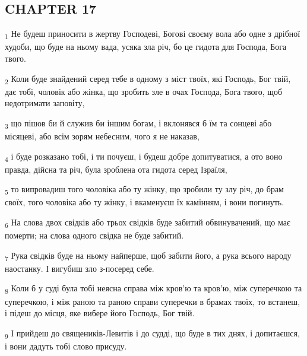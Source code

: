 \subsection{CHAPTER 17}
\begin{tcolorbox}
\textsubscript{1} Не будеш приносити в жертву Господеві, Богові своєму вола або одне з дрібної худоби, що буде на ньому вада, усяка зла річ, бо це гидота для Господа, Бога твого.
\end{tcolorbox}
\begin{tcolorbox}
\textsubscript{2} Коли буде знайдений серед тебе в одному з міст твоїх, які Господь, Бог твій, дає тобі, чоловік або жінка, що зробить зле в очах Господа, Бога твого, щоб недотримати заповіту,
\end{tcolorbox}
\begin{tcolorbox}
\textsubscript{3} що пішов би й служив би іншим богам, і вклонявся б їм та сонцеві або місяцеві, або всім зорям небесним, чого я не наказав,
\end{tcolorbox}
\begin{tcolorbox}
\textsubscript{4} і буде розказано тобі, і ти почуєш, і будеш добре допитуватися, а ото воно правда, дійсна та річ, була зроблена ота гидота серед Ізраїля,
\end{tcolorbox}
\begin{tcolorbox}
\textsubscript{5} то випровадиш того чоловіка або ту жінку, що зробили ту злу річ, до брам своїх, того чоловіка або ту жінку, і вкаменуєш їх камінням, і вони погинуть.
\end{tcolorbox}
\begin{tcolorbox}
\textsubscript{6} На слова двох свідків або трьох свідків буде забитий обвинувачений, що має померти; на слова одного свідка не буде забитий.
\end{tcolorbox}
\begin{tcolorbox}
\textsubscript{7} Рука свідків буде на ньому найперше, щоб забити його, а рука всього народу наостанку. І вигубиш зло з-посеред себе.
\end{tcolorbox}
\begin{tcolorbox}
\textsubscript{8} Коли б у суді була тобі неясна справа між кров'ю та кров'ю, між суперечкою та суперечкою, і між раною та раною справи суперечки в брамах твоїх, то встанеш, і підеш до місця, яке вибере його Господь, Бог твій.
\end{tcolorbox}
\begin{tcolorbox}
\textsubscript{9} І прийдеш до священиків-Левитів і до судді, що буде в тих днях, і допитаєшся, і вони дадуть тобі слово присуду.
\end{tcolorbox}
